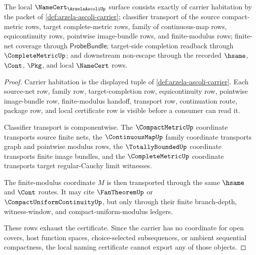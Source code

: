 \begin{theorem}
\label{thm:arzela-ascoli-namecert-obligations}
The local $\NameCert_{\ArzelaAscoliUp}$ surface consists exactly of carrier habitation by the packet of \autoref{def:arzela-ascoli-carrier}; classifier transport of the source compact-metric rows, target complete-metric rows, family of continuous-map rows, equicontinuity rows, pointwise image-bundle rows, and finite-modulus rows; finite-net coverage through $\mathsf{ProbeBundle}$; target-side completion readback through $\CompleteMetricUp$; and downstream non-escape through the recorded $\hsame$, $\Cont$, $\Pkg$, and local $\NameCert$ rows.
\end{theorem}
\begin{proof}
Carrier habitation is the displayed tuple of \autoref{def:arzela-ascoli-carrier}. Each source-net row, family row, target-completion row, equicontinuity row, pointwise image-bundle row, finite-modulus handoff, transport row, continuation route, package row, and local certificate row is visible before a consumer can read it.

Classifier transport is componentwise. The $\CompactMetricUp$ coordinate transports source finite nets, the $\ContinuousMapUp$ family coordinate transports graph and pointwise modulus rows, the $\TotallyBoundedUp$ coordinate transports finite image bundles, and the $\CompleteMetricUp$ coordinate transports target regular-Cauchy limit witnesses.

The finite-modulus coordinate $M$ is then transported through the same $\hsame$ and $\Cont$ routes. It may cite $\FanTheoremUp$ or $\CompactUniformContinuityUp$, but only through their finite branch-depth, witness-window, and compact-uniform-modulus ledgers.

These rows exhaust the certificate. Since the carrier has no coordinate for open covers, host function spaces, choice-selected subsequences, or ambient sequential compactness, the local naming certificate cannot export any of those objects.
\end{proof}

